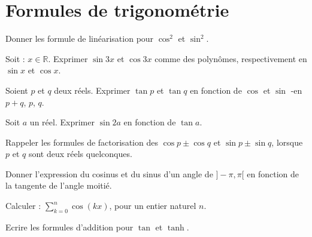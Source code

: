 \section{Formules de trigonom\'etrie}

\begin{ques}
Donner les formule de lin\'earisation pour $\cos^2$ et $\sin^2$.
\end{ques}

\begin{ques}
Soit : $x \in \mathbb{R}$. Exprimer $\sin 3x$ et $\cos 3x$ comme des polyn\^omes, respectivement en $\sin x$ et $\cos x$.
\end{ques}

\begin{ques}
Soient $p$ et $q$ deux réels. Exprimer $\tan p$ et $\tan q$ en fonction de $\cos$ et $\sin$ -en $p + q$, $p$, $q$.
%
\end{ques}

\begin{ques}
Soit $a$ un réel. Exprimer $\sin 2a$ en fonction de $\tan a$.
\end{ques}

\begin{ques}
Rappeler les formules de factorisation des $\cos p \pm \cos q$ et $\sin p \pm \sin q$, lorsque $p$ et $q$ sont deux r\'eels quelconques.
\end{ques}

\begin{ques}
Donner l'expression du cosinus et du sinus d'un angle de $]-\pi , \pi[$ en fonction de la tangente de l'angle moitié.
\end{ques}

\begin{ques}
Calculer : $\sum\limits_{k=0}^{n} \cos(kx)$, pour un entier naturel $n$.
\end{ques}

\begin{ques}
Ecrire les formules d'addition pour $\tan$ et $\tanh$.
\end{ques}